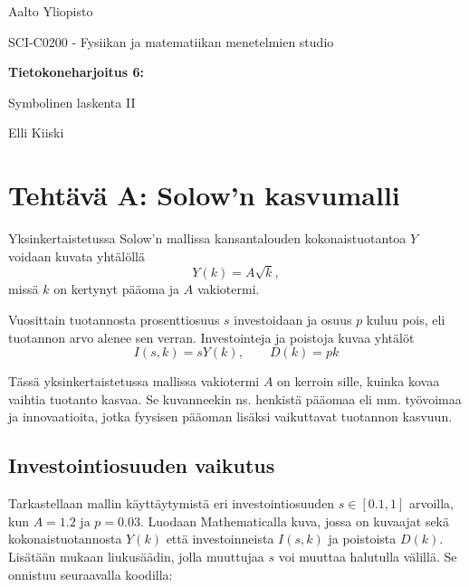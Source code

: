 \documentclass[a4paper,11pt]{article}
\begin{document}
{
\thispagestyle{empty}

{\large
Aalto Yliopisto
\par
SCI-C0200 - Fysiikan ja matematiikan menetelmien studio
}

\vspace{7cm}

{\huge \bf
Tietokoneharjoitus 6: 
\par
Symbolinen laskenta II}

\vspace{2cm}

{\Large Elli Kiiski}

\clearpage

\tableofcontents

\clearpage

\section{Tehtävä A: Solow'n kasvumalli}

Yksinkertaistetussa Solow'n mallissa kansantalouden kokonaistuotantoa $Y$ voidaan kuvata yhtälöllä
\begin{equation}
    Y(k)=A\sqrt{k},
\end{equation}
missä $k$ on kertynyt pääoma ja $A$ vakiotermi.

Vuosittain tuotannosta prosenttiosuus $s$ investoidaan ja osuus $p$ kuluu pois, eli tuotannon arvo alenee sen verran. Investointeja ja poistoja kuvaa yhtälöt
\begin{equation}
    I(s,k)=sY(k), \qquad D(k)=pk
\end{equation}

Tässä yksinkertaistetussa mallissa vakiotermi $A$ on kerroin sille, kuinka kovaa vaihtia tuotanto kasvaa. Se kuvanneekin ns. henkistä pääomaa eli mm. työvoimaa ja innovaatioita, jotka fyysisen pääoman lisäksi vaikuttavat tuotannon kasvuun.

\subsection{Investointiosuuden vaikutus}

Tarkastellaan mallin käyttäytymistä eri investointiosuuden $s \in [0.1,1]$ arvoilla, kun $A=1.2$ ja $p=0.03$. Luodaan Mathematicalla kuva, jossa on kuvaajat sekä kokonaistuotannosta $Y(k)$ että investoinneista $I(s,k)$ ja poistoista $D(k)$. Lisätään mukaan liukusäädin, jolla muuttujaa $s$ voi muuttaa halutulla välillä. Se onnistuu seuraavalla koodilla:

}
\end{document}
